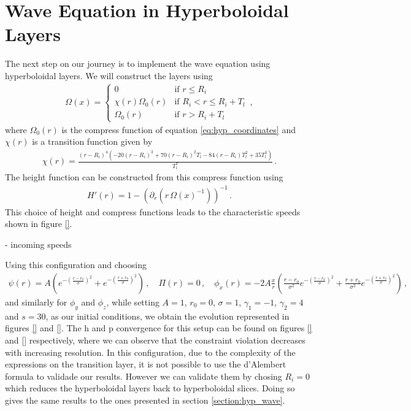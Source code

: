\section{Wave Equation in Hyperboloidal Layers}
\label{section:hyp_layers_wave}

The next step on our journey is to implement the wave equation using hyperboloidal layers. We will construct the layers using 
%
\begin{align}
    \Omega(x) = 
    \begin{cases} 
        0 & \text{if } r \leq R_i \\
        \chi(r) \Omega_0 (r) & \text{if } R_i < r \leq R_i + T_l \\
        \Omega_0 (r) & \text{if } r > R_i + T_l
    \end{cases} \, ,
\end{align}
%
where $\Omega_0 (r)$ is the compress function of equation \eqref{eq:hyp_coordinates} and $\chi(r)$ is a transition function given by
%
\begin{align}
    \chi(r) = \frac{(r - R_i)^4 \left( -20 (r - R_i)^3 + 70 (r - R_i)^2 T_l - 84 (r - R_i) T_l^2 + 35 T_l^3 \right)}{T_l^7} \, .
\end{align}
%
The height function can be constructed from this compress function using
%
\begin{align}
    H'(r) = 1 - \left( \partial_r \left( r \, \Omega(x)^{-1}\right) \right)^{-1} \, .
\end{align}
%
This choice of height and compress functions leads to the characteristic speeds shown in figure \ref{}. 

- incoming speeds

Using this configuration and choosing
%
\begin{align}
    \psi(r) = A \left( e^{-\left(\frac{r - r_0}{\sigma}\right)^2} + e^{-\left(\frac{r + r_0}{\sigma}\right)^2} \right) \, , \quad \Pi(r) = 0 \, , \quad \phi_x(r) = - 2 A \frac{x}{r} \left(\frac{r - r_0}{\sigma^2} e^{-\left(\frac{r - r_0}{\sigma}\right)^2} + \frac{r + r_0}{\sigma^2} e^{-\left(\frac{r + r_0}{\sigma}\right)^2} \right) \, ,
\end{align}
%
and similarly for $\phi_y$ and $\phi_z$, while setting $A = 1$, $r_0 = 0$, $\sigma = 1$, $\gamma_1 = -1$, $\gamma_2 = 4$ and $s = 30$, as our initial conditions, we obtain the evolution represented in figures \ref{} and \ref{}. The h and p convergence for this setup can be found on figures \ref{} and \ref{} respectively, where we can observe that the constraint violation decreases with increasing resolution. In this configuration, due to the complexity of the expressions on the transition layer, it is not possible to use the d'Alembert formula to validade our results. However we can validate them by chosing $R_i = 0$ which reduces the hyperboloidal layers back to hyperboloidal slices. Doing so gives the same results to the ones presented in section \ref{section:hyp_wave}.

